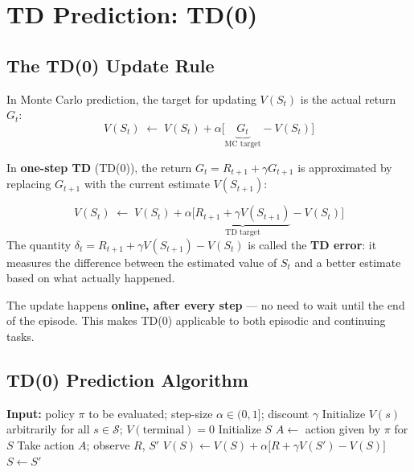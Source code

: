 \documentclass[11pt,a4paper]{article}
\theoremstyle{definition}
\theoremstyle{plain}
\theoremstyle{remark}
\begin{document}
\section{TD Prediction: TD(0)}

\subsection{The TD(0) Update Rule}

In Monte Carlo prediction, the target for updating $V(S_t)$ is the actual return $G_t$:
\[
    V(S_t) \;\leftarrow\; V(S_t) + \alpha\bigl[\underbrace{G_t}_{\text{MC target}} - V(S_t)\bigr]
\]

In \textbf{one-step TD} (TD(0)), the return $G_t = R_{t+1} + \gamma G_{t+1}$ is approximated by replacing $G_{t+1}$ with the current estimate $V(S_{t+1})$:

\begin{tcolorbox}[colback=green!5!white, colframe=green!60!black, title={TD(0) Update Rule}]
\[
    V(S_t) \;\leftarrow\; V(S_t) + \alpha\bigl[\underbrace{R_{t+1} + \gamma V(S_{t+1})}_{\text{TD target}} - V(S_t)\bigr]
\]
The quantity $\delta_t = R_{t+1} + \gamma V(S_{t+1}) - V(S_t)$ is called the \textbf{TD error}: it measures the difference between the estimated value of $S_t$ and a better estimate based on what actually happened.
\end{tcolorbox}

The update happens \textbf{online, after every step} — no need to wait until the end of the episode. This makes TD(0) applicable to both episodic and continuing tasks.

\subsection{TD(0) Prediction Algorithm}

\begin{algorithm}
\caption{Tabular TD(0), estimating $V \approx v_\pi$}
\begin{algorithmic}
\STATE \textbf{Input:} policy $\pi$ to be evaluated; step-size $\alpha \in (0,1]$; discount $\gamma$
\STATE Initialize $V(s)$ arbitrarily for all $s \in \mathcal{S}$; $V(\text{terminal}) = 0$
    \STATE Initialize $S$
    \REPEAT
        \STATE $A \leftarrow$ action given by $\pi$ for $S$
        \STATE Take action $A$; observe $R$, $S'$
        \STATE $V(S) \leftarrow V(S) + \alpha\bigl[R + \gamma V(S') - V(S)\bigr]$
        \STATE $S \leftarrow S'$
\ENDFOR
\end{algorithmic}
\end{algorithm}
\end{document}

